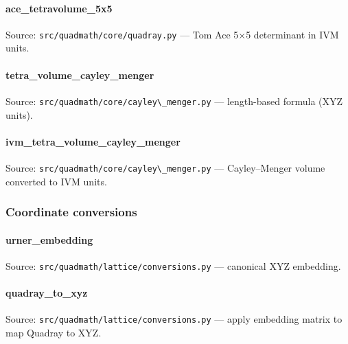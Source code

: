 \documentclass[
  10pt,
]{article}
\newcommand{\passthrough}[1]{#1}
\renewcommand{\texttt}[1]{%
    \colorbox{codebg}{\color{codefg}\ttfamily #1}%
}
\begin{document}
\paragraph{\texorpdfstring{\texttt{ace\_tetravolume\_5x5}}{ace\_tetravolume\_5x5}}\label{code:ace_tetravolume_5x5}

Source: \passthrough{\lstinline!src/quadmath/core/quadray.py!} --- Tom
Ace 5×5 determinant in IVM units.

\paragraph{\texorpdfstring{\texttt{tetra\_volume\_cayley\_menger}}{tetra\_volume\_cayley\_menger}}\label{code:tetra_volume_cayley_menger}

Source: \passthrough{\lstinline!src/quadmath/core/cayley\_menger.py!}
--- length-based formula (XYZ units).

\paragraph{\texorpdfstring{\texttt{ivm\_tetra\_volume\_cayley\_menger}}{ivm\_tetra\_volume\_cayley\_menger}}\label{code:ivm_tetra_volume_cayley_menger}

Source: \passthrough{\lstinline!src/quadmath/core/cayley\_menger.py!}
--- Cayley--Menger volume converted to IVM units.

\subsubsection{Coordinate
conversions}\label{code:coordinate_conversions}

\paragraph{\texorpdfstring{\texttt{urner\_embedding}}{urner\_embedding}}\label{code:urner_embedding}

Source: \passthrough{\lstinline!src/quadmath/lattice/conversions.py!}
--- canonical XYZ embedding.

\paragraph{\texorpdfstring{\texttt{quadray\_to\_xyz}}{quadray\_to\_xyz}}\label{code:quadray_to_xyz}

Source: \passthrough{\lstinline!src/quadmath/lattice/conversions.py!}
--- apply embedding matrix to map Quadray to XYZ.
\end{document}
